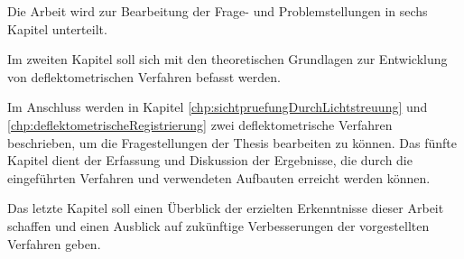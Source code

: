 Die Arbeit wird zur Bearbeitung der Frage- und Problemstellungen in sechs Kapitel unterteilt.

\p
Im zweiten Kapitel soll sich mit den theoretischen Grundlagen zur Entwicklung von deflektometrischen Verfahren befasst werden.

\p
Im Anschluss werden in Kapitel \ref{chp:sichtpruefungDurchLichtstreuung} und \ref{chp:deflektometrischeRegistrierung} zwei deflektometrische Verfahren beschrieben, um die Fragestellungen der Thesis bearbeiten zu können.
\p
Das fünfte Kapitel dient der Erfassung und Diskussion der Ergebnisse, die durch die eingeführten Verfahren und verwendeten Aufbauten erreicht werden können.

\p
Das letzte Kapitel soll einen Überblick der erzielten Erkenntnisse dieser Arbeit schaffen und einen Ausblick auf zukünftige Verbesserungen der vorgestellten Verfahren geben.
